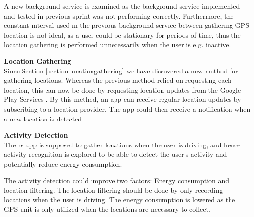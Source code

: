 A new background service is examined as the background service implemented and tested in previous sprint was not performing correctly.
Furthermore, the constant interval used in the previous background service between gathering GPS location is not ideal, as a user could be stationary for periods of time, thus the location gathering is performed unnecessarily when the user is e.g. inactive.

\textbf{Location Gathering}\\
Since Section \ref{section:locationgathering} we have discovered a new method for gathering locations. 
Whereas the previous method relied on requesting each location, this can now be done by requesting location updates from the Google Play Services \cite{receivingLocationUpdates}.
By this method, an app can receive regular location updates by subscribing to a location provider.
The app could then receive a notification when a new location is detected.

\textbf{Activity Detection}\\
The \gls{rs} app is supposed to gather locations when the user is driving, and hence activity recognition is explored to be able to detect the user's activity and potentially reduce energy consumption.

The activity detection could improve two factors: Energy consumption and location filtering.
The location filtering should be done by only recording locations when the user is driving.
The energy consumption is lowered as the GPS unit is only utilized when the locations are necessary to collect.
